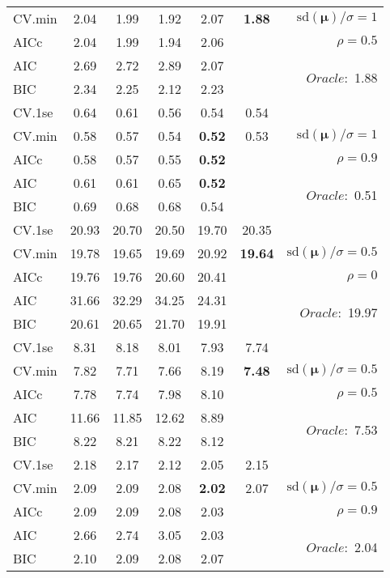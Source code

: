 \begin{table}
\begin{center}
\begin{tabular}{l*{5}{c}|r}
CV.min & 2.04 & 1.99 & 1.92 & 2.07 & {\bf 1.88} &  $\mathrm{sd}(\mathbf{\mu})/\sigma=1$ \\
AICc & 2.04 & 1.99 & 1.94 & 2.06 & & $\rho=0.5$ \\
AIC & 2.69 & 2.72 & 2.89 & 2.07 & &  \multirow{2}{*}{$Oracle: $ 1.88} \\
BIC & 2.34 & 2.25 & 2.12 & 2.23 & &  \\
 \hline 
CV.1se & 0.64 & 0.61 & 0.56 & 0.54 & 0.54 & \\
CV.min & 0.58 & 0.57 & 0.54 & {\bf 0.52} & 0.53 &  $\mathrm{sd}(\mathbf{\mu})/\sigma=1$ \\
AICc & 0.58 & 0.57 & 0.55 & {\bf 0.52} & & $\rho=0.9$ \\
AIC & 0.61 & 0.61 & 0.65 & {\bf 0.52} & &  \multirow{2}{*}{$Oracle: $ 0.51} \\
BIC & 0.69 & 0.68 & 0.68 & 0.54 & &  \\
 \hline 
CV.1se & 20.93 & 20.70 & 20.50 & 19.70 & 20.35 & \\
CV.min & 19.78 & 19.65 & 19.69 & 20.92 & {\bf 19.64} &  $\mathrm{sd}(\mathbf{\mu})/\sigma=0.5$ \\
AICc & 19.76 & 19.76 & 20.60 & 20.41 & & $\rho=0$ \\
AIC & 31.66 & 32.29 & 34.25 & 24.31 & &  \multirow{2}{*}{$Oracle: $ 19.97} \\
BIC & 20.61 & 20.65 & 21.70 & 19.91 & &  \\
 \hline 
CV.1se & 8.31 & 8.18 & 8.01 & 7.93 & 7.74 & \\
CV.min & 7.82 & 7.71 & 7.66 & 8.19 & {\bf 7.48} &  $\mathrm{sd}(\mathbf{\mu})/\sigma=0.5$ \\
AICc & 7.78 & 7.74 & 7.98 & 8.10 & & $\rho=0.5$ \\
AIC & 11.66 & 11.85 & 12.62 & 8.89 & &  \multirow{2}{*}{$Oracle: $ 7.53} \\
BIC & 8.22 & 8.21 & 8.22 & 8.12 & &  \\
 \hline 
CV.1se & 2.18 & 2.17 & 2.12 & 2.05 & 2.15 & \\
CV.min & 2.09 & 2.09 & 2.08 & {\bf 2.02} & 2.07 &  $\mathrm{sd}(\mathbf{\mu})/\sigma=0.5$ \\
AICc & 2.09 & 2.09 & 2.08 & 2.03 & & $\rho=0.9$ \\
AIC & 2.66 & 2.74 & 3.05 & 2.03 & &  \multirow{2}{*}{$Oracle: $ 2.04} \\
BIC & 2.10 & 2.09 & 2.08 & 2.07 & &  \\
 \hline 
\end{tabular}
\end{center}
\vspace{-1cm}
\end{table}




